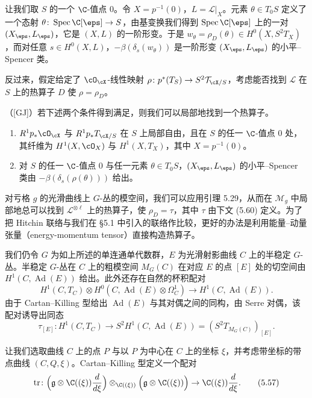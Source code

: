 让我们取 $S$ 的一个 $\C$-值点 $0$。令 $X=p^{-1}(0)$，$L=\mathcal L|_X$。元素 $\theta\in T_0S$ 定义了一个态射 $\theta\colon\operatorname{Spec}\C[\eps]\to S$，由基变换我们得到 $\operatorname{Spec}\C[\eps]$ 上的一对 $(X_\eps,L_\eps)$，它是 $(X,L)$ 的一阶形变。于是 $w_\theta=\rho_D(\theta)\in H^0(X,S^2T_X)$，而对任意 $s\in H^0(X,L)$，$-\beta(\delta_s(w_\theta))$ 是一阶形变 $(X_\eps,L_\eps)$ 的小平–Spencer 类。

反过来，假定给定了 $\cO_{\cX}$-线性映射 $\rho\colon p^*(T_S)\to S^2\mathcal T_{\cX/S}$，考虑能否找到 $\mathcal L$ 在 $S$ 上的热算子 $D$ 使 $\rho=\rho_D$。

\begin{lemma}[5.29]（[GJ]）\quad 若下述两个条件得到满足，则我们可以局部地找到一个热算子。
\begin{enumerate}
\item $R^1p_*\cO_{\cX}$ 与 $R^1p_*T_{\cX/S}$ 在 $S$ 上局部自由，且在 $S$ 的任一 $\C$-值点 $0$ 处，其纤维为 $H^1(X,\cO_X)$ 与 $H^1(X,T_X)$，其中 $X=p^{-1}(0)$。
\item 对 $S$ 的任一 $\C$-值点 $0$ 与任一元素 $\theta\in T_0S$，$(X_\eps,L_\eps)$ 的小平–Spencer 类由 $-\beta(\delta_s(\rho(\theta)))$ 给出。
\end{enumerate}
\end{lemma}


对亏格 $g$ 的光滑曲线上 $G$-丛的模空间，我们可以应用引理 5.29，从而在 $\mathcal M_g$ 中局部地总可以找到 $\mathcal L^{\otimes\ell}$ 上的热算子，使 $\rho_D=\tau$，其中 $\tau$ 由下文 (5.60) 定义。为了把 Hitchin 联络与我们在 §5.1 中引入的联络作比较，更好的办法是利用能量–动量张量（energy-momentum tensor）直接构造热算子。

我们仍令 $G$ 为如上所述的单连通单代数群，$E$ 为光滑射影曲线 $C$ 上的半稳定 $G$-丛。半稳定 $G$-丛在 $C$ 上的粗模空间 $M_G(C)$ 在对应 $E$ 的点 $[E]$ 处的切空间由 $H^1(C,\operatorname{Ad}(E))$ 给出。此外还存在自然的杯积配对
\[
 H^1(C,T_C)\otimes H^0(C,\operatorname{Ad}(E)\otimes\Omega^1_C)\to H^1(C,\operatorname{Ad}(E)).
\]
由于 Cartan–Killing 型给出 $\operatorname{Ad}(E)$ 与其对偶之间的同构，由 Serre 对偶，该配对诱导出同态
\begin{equation}
 \tau_{[E]}\colon H^1(C,T_C)\to S^2H^1(C,\operatorname{Ad}(E))=(S^2T_{M_G(C)})_{[E]}. \tag{5.56}
\end{equation}

让我们选取曲线 $C$ 上的点 $P$ 与以 $P$ 为中心在 $C$ 上的坐标 $\xi$，并考虑带坐标的带点曲线 $(C,Q,\xi)$。Cartan–Killing 型定义一个配对
\begin{equation}
 \operatorname{tr}\colon\Bigl(\mathfrak g\otimes\C((\xi))\frac{d}{d\xi}\Bigr)\otimes_{\C((\xi))}\Bigl(\mathfrak g\otimes\C((\xi))\Bigr)\to\C((\xi))\frac{d}{d\xi}. \tag{5.57}
\end{equation}

